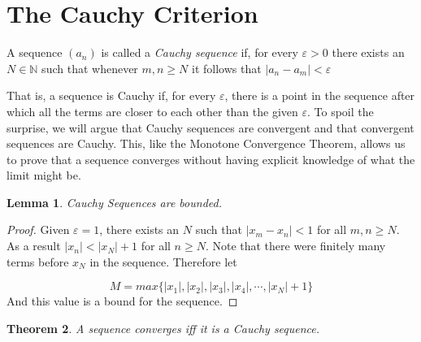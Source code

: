 \documentclass{tufte-book}
\newtheorem{theorem}{Theorem}[chapter]
\newtheorem{lemma}[theorem]{Lemma}
\theoremstyle{definition}
\numberwithin{section}{chapter}
\begin{document}
\section{The Cauchy Criterion}  
  A sequence $(a_n)$ is called a \emph{Cauchy sequence} if, for every $\varepsilon >0$ there exists an $N \in \mathbb{N}$ such that whenever $m,n \geq N$ it follows that $|a_n - a_m| < \varepsilon$

That is, a sequence is Cauchy if, for every $\varepsilon$, there is a point in the sequence after which all the terms are closer to each other than the given $\varepsilon$.  To spoil the surprise, we will argue that Cauchy sequences are convergent and that convergent sequences are Cauchy.  This, like the Monotone Convergence Theorem, allows us to prove that a sequence converges without having explicit knowledge of what the limit might be. 


\begin{lemma} Cauchy Sequences are bounded.\end{lemma}

\begin{proof}
	Given $\varepsilon = 1$, there exists an $N$ such that $|x_m - x_n| <1$ for all $m,n \geq N$.  
	As a result   $|x_n| < |x_N| + 1$ for all $n \geq N$. Note that there were finitely many terms before $x_N$ in the sequence. Therefore let
	
	
	\[	M	= max \{|x_1|,|x_2|, |x_3|, |x_4|, \cdots, |x_N| + 1 \}\]
	And this value is a bound for the sequence.
\end{proof}


\begin{theorem} A sequence converges iff it is a Cauchy sequence. \end{theorem}
\end{document}
